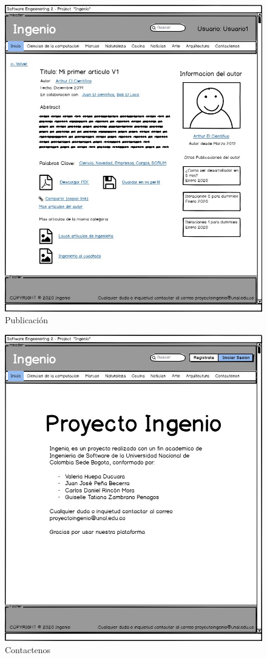 \documentclass[a4paper,12 pt]{article}
\begin{document}
\begin{figure}[H]
    \centering
    \includegraphics[scale = 1.4]{images/Publicacion.jpg}
    \caption{Publicación}
    \label{F109}
\end{figure}{}

\begin{figure}[H]
    \centering
    \includegraphics[scale = 1]{images/Contactenos.jpg}
    \caption{Contactenos}
    \label{F110}
\end{figure}{}
\end{document}
